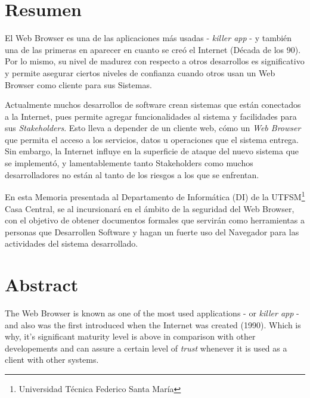 
\section*{Resumen}
\label{chap:resumen}

El Web Browser es una de las aplicaciones más usadas - \textit{killer app} - y también una de las primeras en aparecer en cuanto se creó el Internet (Década de los 90). Por lo mismo, su nivel de madurez con respecto a otros desarrollos es significativo y permite asegurar ciertos niveles de confianza cuando otros usan un Web Browser como cliente para sus Sistemas. 

Actualmente muchos desarrollos de software crean sistemas que están conectados a la Internet, pues permite agregar funcionalidades al sistema y facilidades para sus \textit{Stakeholders}. Esto lleva a depender de un cliente web, cómo un \textit{Web Browser} que permita el acceso a los servicios, datos u operaciones que el sistema entrega. Sin embargo, la Internet influye en la superficie de ataque del nuevo sistema que se implementó, y lamentablemente tanto Stakeholders como muchos desarrolladores no están al tanto de los riesgos a los que se enfrentan.

En esta Memoria presentada al Departamento de Informática (DI) de la UTFSM\footnote{Universidad Técnica Federico Santa María} Casa Central, se al incursionará en el ámbito de la seguridad del Web Browser, con el objetivo de obtener documentos formales que servirán como herramientas a personas que Desarrollen Software y hagan un fuerte uso del Navegador para las actividades del sistema desarrollado.

\section*{Abstract}

The Web Browser is known as one of the most used applications - or \textit{killer app} - and also was the first introduced when the Internet was created (1990). Which is why, it's significant maturity level is above in comparison with other developements and can assure a certain level of \textit{trust} whenever it is used as a client with other systems.

\label{chap:abstract}


